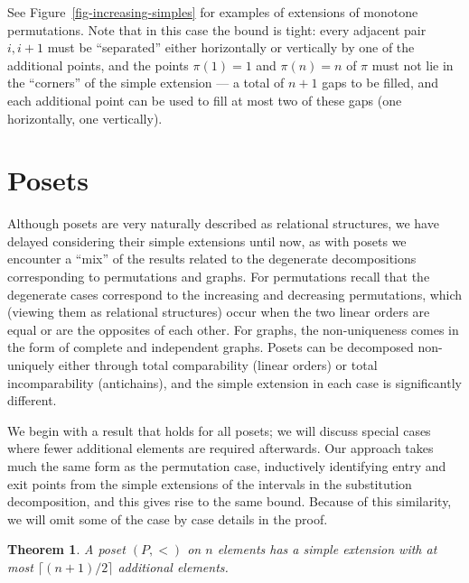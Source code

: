 \documentclass[11pt]{article}
\newtheorem{theorem}{Theorem}[section]
\begin{document}
See Figure~\ref{fig-increasing-simples} for examples of extensions of monotone permutations. Note that in this case the bound is tight: every adjacent pair $i,i+1$ must be ``separated'' either horizontally or vertically by one of the additional points, and the points $\pi(1)=1$ and $\pi(n)=n$ of $\pi$ must not lie in the ``corners'' of the simple extension --- a total of $n+1$ gaps to be filled, and each additional point can be used to fill at most two of these gaps (one horizontally, one vertically).

\section{Posets}\label{sec-posets}

Although posets are very naturally described as relational structures, we have delayed considering their simple extensions until now,
as with posets we encounter a ``mix'' of the results related to the degenerate decompositions corresponding to permutations and graphs.
For permutations recall that the degenerate cases correspond to the increasing and decreasing permutations, which (viewing them as relational structures) occur when the two linear orders are equal or are the opposites of each other.
For graphs, the non-uniqueness comes in the form of complete and independent graphs. Posets can be decomposed non-uniquely either through
total comparability (linear orders) or total incomparability (antichains), and the simple extension in each case is significantly different.

We begin with a result that holds for all posets; we will discuss special cases where fewer additional elements are required afterwards. Our approach takes much the same form as the permutation case, inductively identifying entry and exit points from the simple extensions of the intervals in the substitution decomposition, and this gives rise to the same bound. Because of this similarity, we will omit some of the case by case details in the proof.

\begin{theorem}A poset $(P,<)$ on $n$ elements has a simple extension with at most \mbox{$\lceil(n+1)/2\rceil$} additional elements.
\end{theorem}
\end{document}
